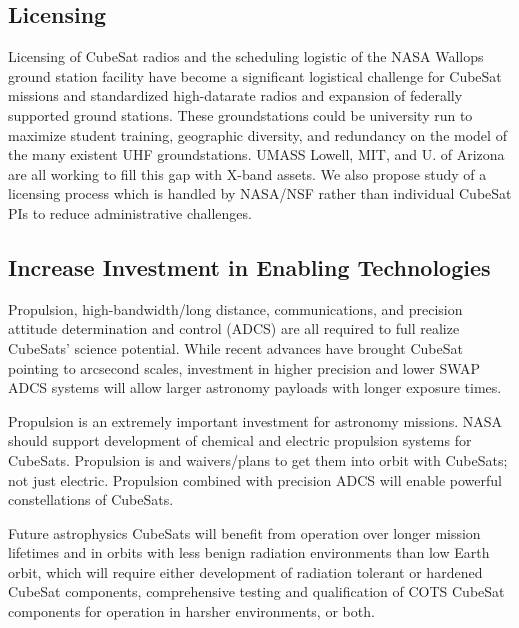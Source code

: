 \documentclass[12pt]{article}
\begin{document}
\subsection{Licensing}
Licensing of CubeSat radios and the scheduling logistic of the NASA Wallops ground station facility have become a significant logistical challenge for CubeSat missions and standardized high-datarate radios and expansion of federally supported ground stations. These groundstations could be university run to  maximize student training, geographic diversity, and redundancy on the model of the many existent UHF groundstations. UMASS Lowell, MIT,  and U. of Arizona are all working to fill this gap with X-band assets. We also propose study of a licensing process which is handled by NASA/NSF rather than individual CubeSat PIs to reduce administrative challenges. 

\subsection{Increase Investment in Enabling Technologies}
Propulsion, high-bandwidth/long distance, communications, and precision attitude determination and control (ADCS) are all required to full realize CubeSats’ science potential. 
While recent advances have brought CubeSat pointing to arcsecond scales, investment in higher precision and lower SWAP ADCS systems will allow larger astronomy payloads with longer exposure times.

Propulsion is an extremely important investment for astronomy missions. NASA should support development of chemical and electric propulsion systems for CubeSats. Propulsion is  and waivers/plans to get them into orbit with CubeSats; not just electric.
Propulsion combined with precision ADCS will enable powerful constellations of CubeSats.

Future astrophysics CubeSats will benefit from operation over longer mission lifetimes and in orbits with less benign radiation environments than low Earth orbit, which will require either development of radiation tolerant or hardened CubeSat components, comprehensive testing and qualification of COTS CubeSat components for operation in harsher environments, or both. 
\end{document}
